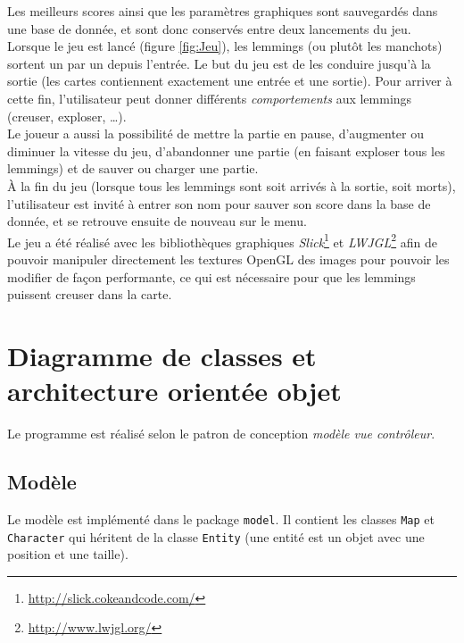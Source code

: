 \documentclass[a4paper,12pt]{article}
\begin{document}
Les meilleurs scores ainsi que les paramètres graphiques sont sauvegardés
dans une base de donnée, et sont donc conservés entre deux lancements du
jeu.\\

Lorsque le jeu est lancé (figure \ref{fig:Jeu}), les lemmings (ou
plutôt les manchots) sortent un par un depuis l'entrée. Le but du jeu est
de les conduire jusqu'à la sortie (les cartes contiennent exactement
une entrée et une sortie). Pour arriver à cette fin, l'utilisateur
peut donner différents \emph{comportements} aux lemmings (creuser,
exploser, \dots).\\

Le joueur a aussi la possibilité de mettre la partie en pause,
d'augmenter ou diminuer la vitesse du jeu, d'abandonner une partie (en
faisant exploser tous les lemmings) et de sauver ou charger une
partie.\\

À la fin du jeu (lorsque tous les lemmings sont soit arrivés à la
sortie, soit morts), l'utilisateur est invité à entrer son nom pour
sauver son score dans la base de donnée, et se retrouve ensuite de
nouveau sur le menu.\\

Le jeu a été réalisé avec les bibliothèques graphiques
\emph{Slick}\footnote{\url{http://slick.cokeandcode.com/}} et
\emph{LWJGL}\footnote{\url{http://www.lwjgl.org/}} afin de pouvoir
manipuler directement les textures OpenGL des images pour pouvoir les
modifier de façon performante, ce qui est nécessaire pour que les
lemmings puissent creuser dans la carte.

\section{Diagramme de classes et architecture orientée objet}
Le programme est réalisé selon le patron de conception \emph{modèle
  vue contrôleur}.

\subsection{Modèle\label{sec:model}}
Le modèle est implémenté dans le package \texttt{model}. Il contient
les classes \texttt{Map} et \texttt{Character} qui héritent de la
classe \texttt{Entity} (une entité est un objet avec une position et
une taille).
\end{document}
